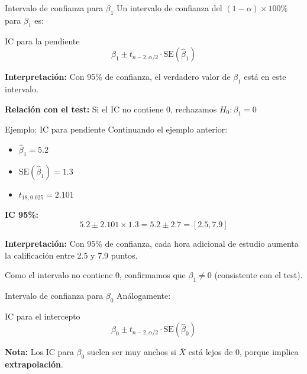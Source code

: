 \documentclass[aspectratio=169]{beamer}
\begin{document}
\begin{frame}{Intervalo de confianza para $\beta_1$}
Un intervalo de confianza del $(1-\alpha)\times 100\%$ para $\beta_1$ es:

\begin{block}{IC para la pendiente}
\[
\hat{\beta}_1 \pm t_{n-2, \alpha/2} \cdot \text{SE}(\hat{\beta}_1)
\]
\end{block}

\vspace{0.5cm}
\textbf{Interpretación:} Con 95\% de confianza, el verdadero valor de $\beta_1$ está en este intervalo.

\vspace{0.5cm}
\textbf{Relación con el test:} Si el IC no contiene 0, rechazamos $H_0: \beta_1 = 0$
\end{frame}

\begin{frame}{Ejemplo: IC para pendiente}
Continuando el ejemplo anterior:

\begin{itemize}
    \item $\hat{\beta}_1 = 5.2$
    \item $\text{SE}(\hat{\beta}_1) = 1.3$
    \item $t_{18, 0.025} = 2.101$
\end{itemize}

\vspace{0.3cm}
\textbf{IC 95\%:}
\[
5.2 \pm 2.101 \times 1.3 = 5.2 \pm 2.7 = [2.5, 7.9]
\]

\vspace{0.5cm}
\textbf{Interpretación:} Con 95\% de confianza, cada hora adicional de estudio aumenta la calificación entre 2.5 y 7.9 puntos.

\vspace{0.3cm}
Como el intervalo no contiene 0, confirmamos que $\beta_1 \neq 0$ (consistente con el test).
\end{frame}

\begin{frame}{Intervalo de confianza para $\beta_0$}
Análogamente:

\begin{block}{IC para el intercepto}
\[
\hat{\beta}_0 \pm t_{n-2, \alpha/2} \cdot \text{SE}(\hat{\beta}_0)
\]
\end{block}

\vspace{0.5cm}
\textbf{Nota:} Los IC para $\beta_0$ suelen ser muy anchos si $\bar{X}$ está lejos de 0, porque implica \textbf{extrapolación}.
\end{frame}
\end{document}
